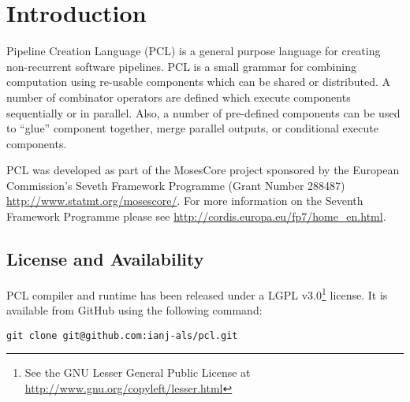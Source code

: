 \chapter{Introduction}
Pipeline Creation Language (PCL) is a general purpose language for creating non-recurrent software pipelines. PCL is a small grammar for combining computation using re-usable components which can be shared or distributed. A number of combinator operators are defined which execute components sequentially or in parallel. Also, a number of pre-defined components can be used to ``glue'' component together, merge parallel outputs, or conditional execute components.

PCL was developed as part of the MosesCore project sponsored by the European Commission's Seveth Framework Programme (Grant Number 288487) \url{http://www.statmt.org/mosescore/}. For more information on the Seventh Framework Programme please see \url{http://cordis.europa.eu/fp7/home_en.html}.

\section{License and Availability}
PCL compiler and runtime has been released under a LGPL v3.0\footnote{See the GNU Lesser General Public License at \url{http://www.gnu.org/copyleft/lesser.html}} license. It is available from GitHub using the following command:
\begin{verbatim}
git clone git@github.com:ianj-als/pcl.git
\end{verbatim}
